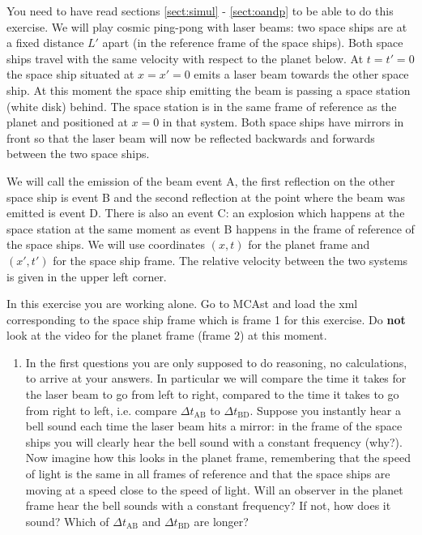 {\begin{multicols}{2}
\vspace{0.5cm}



You need to have read sections \ref{sect:simul} - \ref{sect:oandp} to be able to do this exercise. We will play cosmic ping-pong with laser beams: two space ships are at a fixed distance $L'$ apart (in the reference frame of the space ships). Both space ships travel with the same velocity with respect to the planet below. At $t=t'=0$ the space ship situated at $x=x'=0$ emits a laser beam towards the other space ship. At this moment the space ship emitting the beam is passing a space station (white disk) behind. The space station is in the same frame of reference as the planet and positioned at $x=0$ in that system. Both space ships have mirrors in front so that the laser beam will now be reflected backwards and forwards between the two space ships.

We will call the emission of the beam event A, the first reflection on the other space ship is event B and the second reflection at the point where the beam was emitted is event D. There is also an event C: an explosion which happens at the space station at the same moment as event B happens in the frame of reference of the space ships. We will use coordinates $(x,t)$ for the planet frame and $(x',t')$ for the space ship frame. The relative velocity between the two systems is given in the upper left corner.

In this exercise you are working alone. Go to MCAst and load the xml
corresponding to the space ship frame which is frame 1 for this
exercise. Do {\bf not} look at the video for the planet frame (frame 2) at this moment.

\begin{enumerate}

\item In the first questions you are only supposed to do reasoning, no calculations, to arrive at your answers. In particular we will compare the time it takes for the laser beam to go from left to right, compared to the time it takes to go from right to left, i.e. compare $\Delta t_\mathrm{AB}$ to $\Delta t_\mathrm{BD}$. Suppose you instantly hear a bell sound each time the laser beam hits a mirror: in the frame of the space ships you will clearly hear the bell sound with a constant frequency (why?). Now imagine how this looks in the planet frame, remembering that the speed of light is the same in all frames of reference and that the space ships are moving at a speed close to the speed of light. Will an observer in the planet frame hear the bell sounds with a constant frequency? If not, how does it sound? Which of $\Delta t_\mathrm{AB}$ and $\Delta t_\mathrm{BD}$ are longer?


\end{enumerate}
\end{multicols}}
